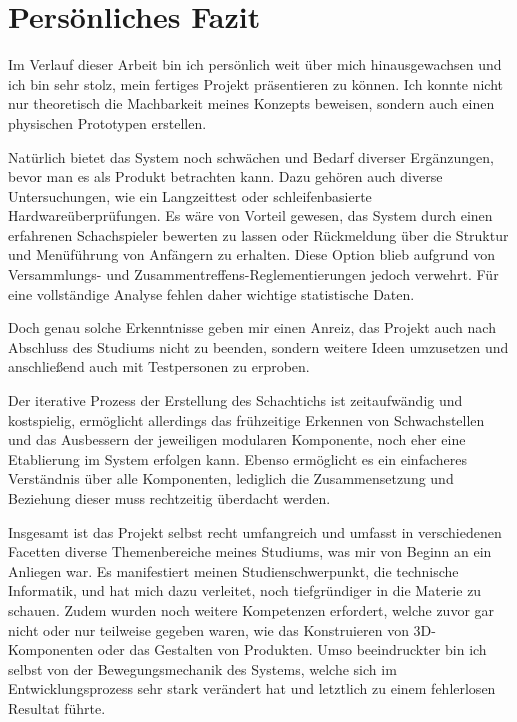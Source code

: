 \hypertarget{persuxf6nliches-fazit}{%
\section{Persönliches Fazit}\label{persuxf6nliches-fazit}}

Im Verlauf dieser Arbeit bin ich persönlich weit über mich
hinausgewachsen und ich bin sehr stolz, mein fertiges Projekt
präsentieren zu können. Ich konnte nicht nur theoretisch die Machbarkeit
meines Konzepts beweisen, sondern auch einen physischen Prototypen
erstellen.

Natürlich bietet das System noch schwächen und Bedarf diverser
Ergänzungen, bevor man es als Produkt betrachten kann. Dazu gehören auch
diverse Untersuchungen, wie ein Langzeittest oder schleifenbasierte
Hardwareüberprüfungen. Es wäre von Vorteil gewesen, das System durch
einen erfahrenen Schachspieler bewerten zu lassen oder Rückmeldung über
die Struktur und Menüführung von Anfängern zu erhalten. Diese Option
blieb aufgrund von Versammlungs- und Zusammentreffens-Reglementierungen
jedoch verwehrt. Für eine vollständige Analyse fehlen daher wichtige
statistische Daten.

Doch genau solche Erkenntnisse geben mir einen Anreiz, das Projekt auch
nach Abschluss des Studiums nicht zu beenden, sondern weitere Ideen
umzusetzen und anschließend auch mit Testpersonen zu erproben.

Der iterative Prozess der Erstellung des Schachtichs ist zeitaufwändig
und kostspielig, ermöglicht allerdings das frühzeitige Erkennen von
Schwachstellen und das Ausbessern der jeweiligen modularen Komponente,
noch eher eine Etablierung im System erfolgen kann. Ebenso ermöglicht es
ein einfacheres Verständnis über alle Komponenten, lediglich die
Zusammensetzung und Beziehung dieser muss rechtzeitig überdacht werden.

Insgesamt ist das Projekt selbst recht umfangreich und umfasst in
verschiedenen Facetten diverse Themenbereiche meines Studiums, was mir
von Beginn an ein Anliegen war. Es manifestiert meinen
Studienschwerpunkt, die technische Informatik, und hat mich dazu
verleitet, noch tiefgründiger in die Materie zu schauen. Zudem wurden
noch weitere Kompetenzen erfordert, welche zuvor gar nicht oder nur
teilweise gegeben waren, wie das Konstruieren von 3D-Komponenten oder
das Gestalten von Produkten. Umso beeindruckter bin ich selbst von der
Bewegungsmechanik des Systems, welche sich im Entwicklungsprozess sehr
stark verändert hat und letztlich zu einem fehlerlosen Resultat führte.

